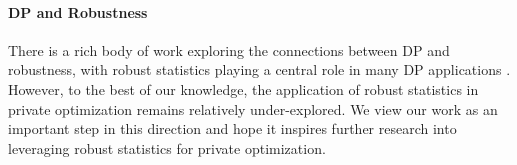 \paragraph{DP and Robustness}  
There is a rich body of work exploring the connections between DP and robustness, with robust statistics playing a central role in many DP applications \citep{dwork2009differential, slavkovic2012perturbed, liu2022differential, asi2023robustness}. However, to the best of our knowledge, the application of robust statistics in private optimization remains relatively under-explored.  
We view our work as an important step in this direction and hope it inspires further research into leveraging robust statistics for private optimization.














